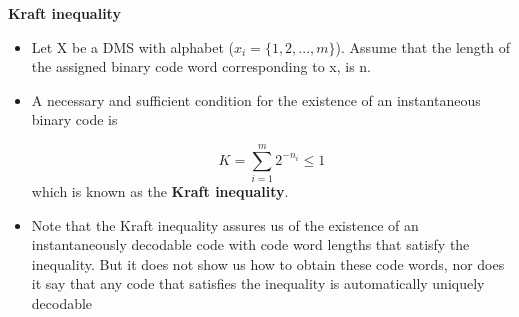 \noindent \textbf{ Kraft inequality}
\begin{itemize}
\item Let X be a DMS with alphabet ($x _i = \{1, 2, . . . ,m\}$). Assume that the length of the assigned binary
code word corresponding to x, is n.
\item A necessary and sufficient condition for the existence of an instantaneous binary code is

 \[ K = \sum^{m}_{i=1}2^{-n_i} \leq 1 \]
which is known as the \textbf{Kraft inequality}.
\item Note that the Kraft inequality assures us of the existence of an instantaneously decodable code
with code word lengths that satisfy the inequality. But it does not show us how to obtain these code
words, nor does it say that any code that satisfies the inequality is automatically uniquely decodable
\end{itemize}


